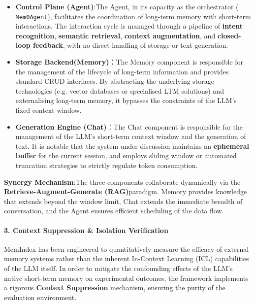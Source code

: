 \begin{itemize}
\item \textbf{Control Plane (Agent)}:The Agent, in its capacity as the orchestrator ( \texttt{Mem0Agent}), facilitates the coordination of long-term memory with short-term interactions. The interaction cycle is managed through a pipeline of \textbf{intent recognition}, \textbf{semantic retrieval}, \textbf{context augmentation}, and \textbf{closed-loop feedback}, with no direct handling of storage or text generation.
\item \textbf{Storage Backend(Memory)}：The Memory component is responsible for the management of the lifecycle of long-term information and provides standard CRUD interfaces. By abstracting the underlying storage technologies (e.g. vector databases or specialised LTM solutions) and externalising long-term memory, it bypasses the constraints of the LLM's fixed context window.
\item \textbf{Generation Engine (Chat)}：The Chat component is responsible for the management of the LLM's short-term context window and the generation of text. It is notable that the system under discussion maintains an \textbf{ephemeral buffer} for the current session, and employs sliding window or automated truncation strategies to strictly regulate token consumption.
\end{itemize}

\textbf{Synergy Mechanism}:The three components collaborate dynamically via the \textbf{Retrieve-Augment-Generate (RAG)}paradigm. Memory provides knowledge that extends beyond the window limit, Chat extends the immediate breadth of conversation, and the Agent ensures efficient scheduling of the data flow.

\paragraph{3. Context Suppression \& Isolation Verification}

MemIndex has been engineered to quantitatively measure the efficacy of external memory systems rather than the inherent In-Context Learning (ICL) capabilities of the LLM itself. In order to mitigate the confounding effects of the LLM's native short-term memory on experimental outcomes, the framework implements a rigorous \textbf{Context Suppression} mechanism, ensuring the purity of the evaluation environment.

